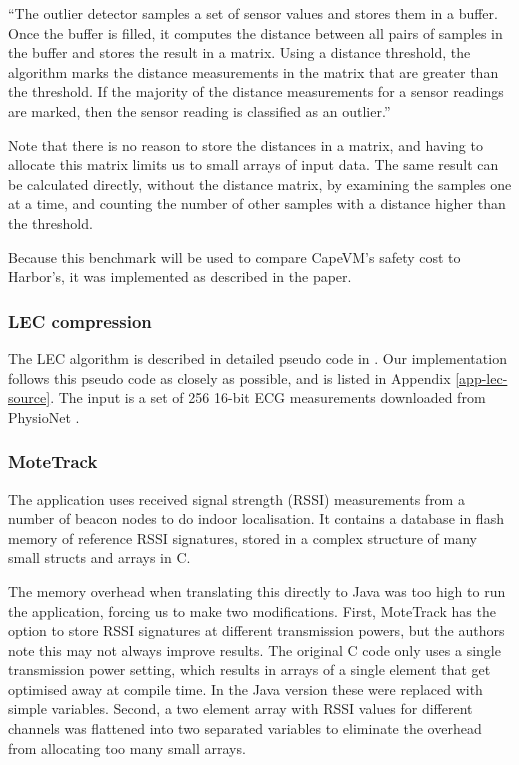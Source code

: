 \begin{displayquote}“The outlier detector samples a set of sensor values and stores them in a buffer. Once the buffer is filled, it computes the distance between all pairs of samples in the buffer and stores the result in a matrix. Using a distance threshold, the algorithm marks the distance measurements in the matrix that are greater than the threshold. If the majority of the distance measurements for a sensor readings are marked, then the sensor reading is classified as an outlier.”\end{displayquote}

Note that there is no reason to store the distances in a matrix, and having to allocate this matrix limits us to small arrays of input data. The same result can be calculated directly, without the distance matrix, by examining the samples one at a time, and counting the number of other samples with a distance higher than the threshold.

Because this benchmark will be used to compare CapeVM's safety cost to Harbor's, it was implemented as described in the paper.

\subsubsection{LEC compression}
The LEC algorithm is described in detailed pseudo code in \cite{Marcelloni:2009ja}. Our implementation follows this pseudo code as closely as possible, and is listed in Appendix \ref{app-lec-source}. The input is a set of 256 16-bit ECG measurements downloaded from PhysioNet \cite{physionet-ecg-data}.

\subsubsection{MoteTrack}
\label{sec-evaluation-benchmark-implementation-motetrack}
The  application uses received signal strength (RSSI) measurements from a number of beacon nodes to do indoor localisation. It contains a database in flash memory of reference RSSI signatures, stored in a complex structure of many small structs and arrays in C.

The memory overhead when translating this directly to Java was too high to run the application, forcing us to make two modifications. First, MoteTrack has the option to store RSSI signatures at different transmission powers, but the authors note this may not always improve results. The original C code only uses a single transmission power setting, which results in arrays of a single element that get optimised away at compile time. In the Java version these were replaced with simple variables. Second, a two element array with RSSI values for different channels was flattened into two separated variables to eliminate the overhead from allocating too many small arrays.

